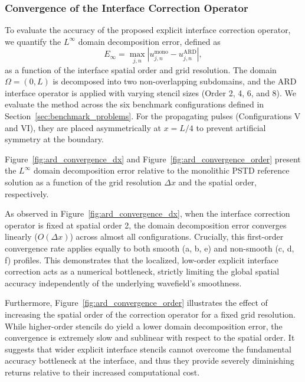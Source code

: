 \documentclass{Configuration_Files/PoliMi3i_thesis}
\begin{document}
\subsubsection{Convergence of the Interface Correction Operator}

To evaluate the accuracy of the proposed explicit interface correction operator, we quantify the $L^\infty$ domain decomposition error, defined as
\begin{equation*}
E_{\infty} = \max_{j,n} \left| u_{j,n}^{\text{mono}} - u_{j,n}^{\text{ARD}} \right|,
\end{equation*}
as a function of the interface spatial order and grid resolution. The domain $\Omega=(0,L)$ is decomposed into two non-overlapping subdomains, and the ARD interface operator is applied with varying stencil sizes (Order 2, 4, 6, and 8). We evaluate the method across the six benchmark configurations defined in Section~\ref{sec:benchmark_problems}. For the propagating pulses (Configurations V and VI), they are placed asymmetrically at $x=L/4$ to prevent artificial symmetry at the boundary.

Figure~\ref{fig:ard_convergence_dx} and Figure~\ref{fig:ard_convergence_order} present the $L^\infty$ domain decomposition error relative to the monolithic PSTD reference solution as a function of the grid resolution $\Delta x$ and the spatial order, respectively. 

As observed in Figure~\ref{fig:ard_convergence_dx}, when the interface correction operator is fixed at spatial order 2, the domain decomposition error converges linearly ($O(\Delta x)$) across almost all configurations. Crucially, this first-order convergence rate applies equally to both smooth (a, b, e) and non-smooth (c, d, f) profiles. This demonstrates that the localized, low-order explicit interface correction acts as a numerical bottleneck, strictly limiting the global spatial accuracy independently of the underlying wavefield's smoothness.

Furthermore, Figure~\ref{fig:ard_convergence_order} illustrates the effect of increasing the spatial order of the correction operator for a fixed grid resolution. While higher-order stencils do yield a lower domain decomposition error, the convergence is extremely slow and sublinear with respect to the spatial order. It suggests that wider explicit interface stencils cannot overcome the fundamental accuracy bottleneck at the interface, and thus they provide severely diminishing returns relative to their increased computational cost.
\end{document}
